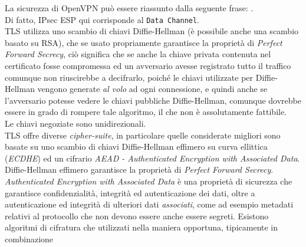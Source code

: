 La sicurezza di OpenVPN può essere riassunto dalla seguente frase:
\cite{openvpn-security-faq}.\\
Di fatto, IPsec ESP qui corrisponde al \texttt{Data Channel}.\\
TLS utilizza uno scambio di chiavi Diffie-Hellman (è possibile anche una scambio
basato su RSA), che se usato propriamente garantisce la proprietà di \textit{Perfect Forward Secrecy}, ciò
significa che se anche la chiave privata contenuta nel certificato fosse compromessa
ed un avversario avesse registrato tutto il traffico comunque non riuscirebbe a decifrarlo,
poiché le chiavi utilizzate per Diffie-Hellman vengono generate \textit{al volo} ad
ogni connessione, e quindi anche se l'avversario potesse vedere le chiavi pubbliche
Diffie-Hellman, comunque dovrebbe essere in grado di rompere tale algoritmo, il che
non è assolutamente fattibile.\\
Le chiavi negoziate sono unidirezionali.\\
TLS offre diverse \textit{cipher-suite}, in particolare quelle considerate migliori
sono basate su uno scambio di chiavi Diffie-Hellman effimero su curva ellittica
(\textit{ECDHE}) ed un cifrario \textit{AEAD - Authenticated Encryption with Associated Data}.
Diffie-Hellman effimero garantisce la proprietà di \textit{Perfect Forward Secrecy}.\\
\textit{Authenticated Encryption with Associated Data} è una proprietà di sicurezza
che garantisce confidenzialità, integrità ed autenticazione dei dati, oltre
a autenticazione ed integrità di ulteriori dati \textit{associati}, come ad esempio
metadati relativi al protocollo che non devono essere anche essere segreti.
Esistono algoritmi di cifratura che utilizzati nella maniera opportuna, tipicamente in combinazione
